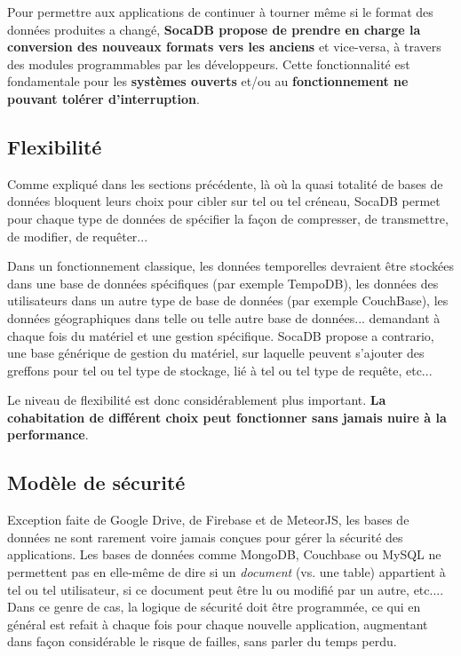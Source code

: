 \documentclass[a4paper,10pt]{scrreprt}
\begin{document}
            Pour permettre aux applications de continuer à tourner même si le format des données produites a changé, \textbf{SocaDB propose de prendre en charge la conversion des nouveaux formats vers les anciens} et vice-versa, à travers des modules programmables par les développeurs. Cette fonctionnalité est fondamentale pour les \textbf{systèmes ouverts} et/ou au \textbf{fonctionnement ne pouvant tolérer d'interruption}.
        
        \subsection{Flexibilité}
        
            Comme expliqué dans les sections précédente, là où la quasi totalité de bases de données bloquent leurs choix pour cibler sur tel ou tel créneau, SocaDB permet pour chaque type de données de spécifier la façon de compresser, de transmettre, de modifier, de requêter...
            
            Dans un fonctionnement classique, les données temporelles devraient être stockées dans une base de données spécifiques (par exemple TempoDB), les données des utilisateurs dans un autre type de base de données (par exemple CouchBase), les don\-nées géographiques dans telle ou telle autre base de données... demandant à chaque fois du matériel et une gestion spécifique. SocaDB propose a contrario, une base générique de gestion du matériel, sur laquelle peuvent s'ajouter des greffons pour tel ou tel type de stockage, lié à tel ou tel type de requête, etc...
            
            Le niveau de flexibilité est donc considérablement plus important. \textbf{La cohabitation de différent choix peut fonctionner sans jamais nuire à la performance}.
        
        \subsection{Modèle de sécurité}
        
            Exception faite de Google Drive, de Firebase et de MeteorJS, les bases de données ne sont rarement voire jamais conçues pour gérer la sécurité des applications. Les bases de données comme MongoDB, Couchbase ou MySQL ne permettent pas en elle-même de dire si un \textit{document} (vs. une table) appartient à tel ou tel utilisateur, si ce document peut être lu ou modifié par un autre, etc.... Dans ce genre de cas, la logique de sécurité doit être programmée, ce qui en général est refait à chaque fois pour chaque nouvelle application, augmentant dans façon considérable le risque de failles, sans parler du temps perdu.
            
\end{document}
